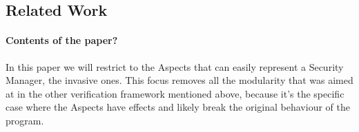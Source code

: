\subsection{Related Work}


\paragraph{Contents of the paper?}
In this paper we will restrict to the Aspects that can easily
represent a Security Manager, the invasive ones. This focus removes
all the modularity that was aimed at in the other verification
framework mentioned above, because it's the specific case where the
Aspects have effects and likely break the original behaviour of the
program.

